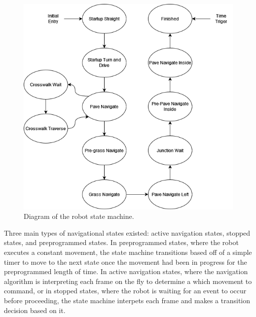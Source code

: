 \documentclass[titlepage]{article}
\begin{document}
        \begin{figure}
            \includegraphics[width=\linewidth]{statemachine.png}
            \caption{Diagram of the robot state machine.}
            \label{fig:statemachine}
        \end{figure}

        Three main types of navigational states existed: active navigation states, stopped states, and preprogrammed states. In preprogrammed states, where the robot executes a constant movement, the state machine transitions based off of a simple timer to move to the next state once the movement had been in progress for the preprogrammed length of time. In active navigation states, where the navigation algorithm is interpreting each frame on the fly to determine a which movement to command, or in stopped states, where the robot is waiting for an event to occur before proceeding, the state machine interpets each frame and makes a transition decision based on it.
\end{document}
